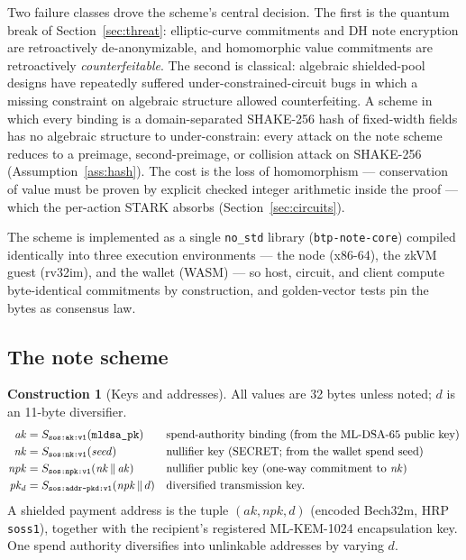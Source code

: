 \documentclass[11pt]{article}
\newcommand{\code}[1]{\texttt{#1}}
\newcommand{\mldsa}{ML\mbox{-}DSA\mbox{-}65}
\newcommand{\mlkem}{ML\mbox{-}KEM\mbox{-}1024}
\newcommand{\shake}{SHAKE\mbox{-}256}
\newcommand{\concat}{\,\|\,}
\theoremstyle{plain}
\theoremstyle{definition}
\newtheorem{construction}[theorem]{Construction}
\theoremstyle{remark}
\begin{document}
Two failure classes drove the scheme's central decision. The first is the
quantum break of Section~\ref{sec:threat}: elliptic-curve commitments and DH
note encryption are retroactively de-anonymizable, and homomorphic value
commitments are retroactively \emph{counterfeitable}. The second is
classical: algebraic shielded-pool designs have repeatedly suffered
under-constrained-circuit bugs in which a missing constraint on algebraic
structure allowed counterfeiting. A scheme in which every binding is a
domain-separated \shake{} hash of fixed-width fields has no algebraic
structure to under-constrain: every attack on the note scheme reduces to a
preimage, second-preimage, or collision attack on \shake{}
(Assumption~\ref{ass:hash}). The cost is the loss of homomorphism ---
conservation of value must be proven by explicit checked integer arithmetic
inside the proof --- which the per-action STARK absorbs
(Section~\ref{sec:circuits}).

The scheme is implemented as a single \code{no\_std} library
(\code{btp-note-core}) compiled identically into three execution
environments --- the node (x86-64), the zkVM guest (rv32im), and the wallet
(WASM) --- so host, circuit, and client compute byte-identical commitments by
construction, and golden-vector tests pin the bytes as consensus law.

\subsection{The note scheme}
\label{sec:notes}

\begin{construction}[Keys and addresses]
\label{con:keys}
All values are 32 bytes unless noted; $d$ is an 11-byte diversifier.
\begin{align*}
\mathit{ak} &= S_{\code{sos:ak:v1}}(\code{mldsa\_pk})
  && \text{spend-authority binding (from the \mldsa{} public key)} \\
\mathit{nk} &= S_{\code{sos:nk:v1}}(\mathit{seed})
  && \text{nullifier key (SECRET; from the wallet spend seed)} \\
\mathit{npk} &= S_{\code{sos:npk:v1}}(\mathit{nk} \concat \mathit{ak})
  && \text{nullifier public key (one-way commitment to } \mathit{nk}\text{)} \\
\mathit{pk_d} &= S_{\code{sos:addr-pkd:v1}}(\mathit{npk} \concat d)
  && \text{diversified transmission key.}
\end{align*}
A shielded payment address is the tuple $(\mathit{ak}, \mathit{npk}, d)$
(encoded Bech32m, HRP \code{soss1}), together with the recipient's registered
\mlkem{} encapsulation key. One spend authority diversifies into unlinkable
addresses by varying $d$.
\end{construction}
\end{document}

